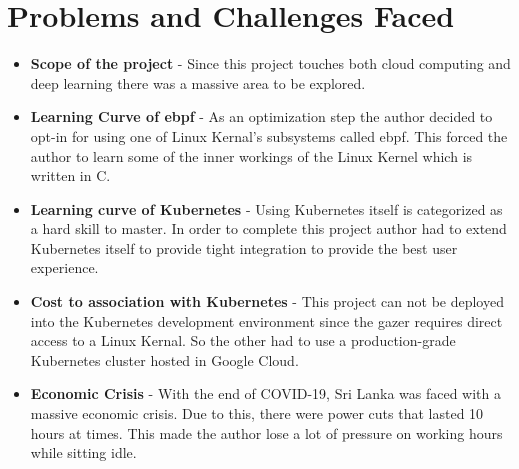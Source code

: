 \section{Problems and Challenges Faced}

\begin{itemize}[noitemsep,nolistsep]
    \item \textbf{Scope of the project} - Since this project touches both cloud computing and deep learning there was a massive area to be explored.
    \item \textbf{Learning Curve of \ac{ebpf}} - As an optimization step the author decided to opt-in for using one of Linux Kernal's subsystems called \ac{ebpf}. This forced the author to learn some of the inner workings of the Linux Kernel which is written in C.
    \item \textbf{Learning curve of Kubernetes} - Using Kubernetes itself is categorized as a hard skill to master. In order to complete this project author had to extend Kubernetes itself to provide tight integration to provide the best user experience.
    \item \textbf{Cost to association with Kubernetes} - This project can not be deployed into the Kubernetes development environment since the \ac{gazer} requires direct access to a Linux Kernal. So the other had to use a production-grade Kubernetes cluster hosted in Google Cloud.
    \item \textbf{Economic Crisis} - With the end of COVID-19, Sri Lanka was faced with a massive economic crisis. Due to this, there were power cuts that lasted 10 hours at times. This made the author lose a lot of pressure on working hours while sitting idle.
\end{itemize}